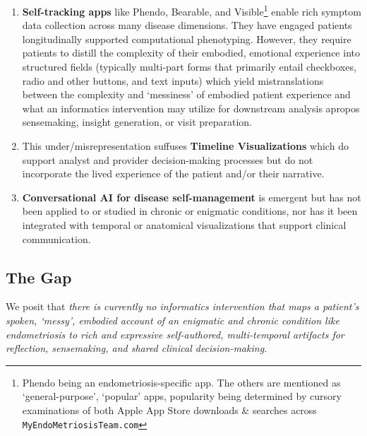 \begin{enumerate}
  \item \textbf{Self-tracking apps} like Phendo\cite{McKillop2019Thesis,CitizenEndoPhendo}, Bearable\cite{BearableApp}, and Visible\cite{VisibleHealth}\footnote{Phendo being an endometriosis-specific app. The others are mentioned as `general-purpose', `popular'  apps, popularity being determined by cursory examinations of both Apple App Store downloads \& searches across \texttt{MyEndoMetriosisTeam.com}} enable rich symptom data collection across many disease dimensions. They have engaged patients longitudinally\cite{Urteaga2022Engagement} supported computational phenotyping\cite{Urteaga2020Phenotypes,McKillop2019Thesis}. However, they require patients to distill the complexity of their embodied, emotional experience into structured fields (typically multi-part forms that primarily entail checkboxes, radio and other buttons, and text inputs) which yield mistranslations between the complexity and `messiness' of embodied patient experience and what an informatics intervention may utilize for downstream analysis apropos sensemaking, insight generation, or visit preparation.
  \item This under/misrepresentation suffuses \textbf{Timeline Visualizations} which do support analyst and provider decision-making processes but do not incorporate the lived experience of the patient and/or their narrative\cite{Ledesma2019HealthTimeline}.
  \item \textbf{Conversational AI for disease self-management} is emergent\cite{kocielnik2018reflection} but has not been applied to or studied in chronic or enigmatic conditions, nor has it been integrated with temporal or anatomical visualizations that support clinical communication.
\end{enumerate}

\subsection{The Gap}

We posit that \textit{there is currently no informatics intervention that maps a patient's spoken, `messy', embodied account of an enigmatic and chronic condition like endometriosis to rich and expressive self-authored, multi-temporal artifacts for reflection, sensemaking, and shared clinical decision-making.}
